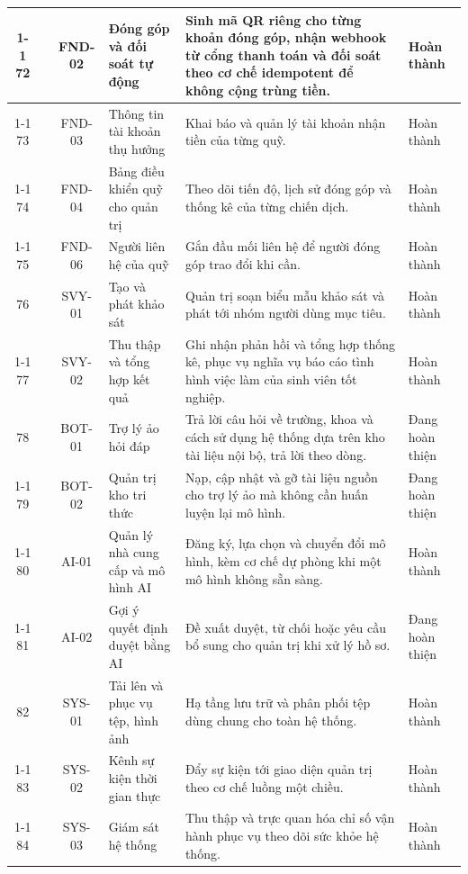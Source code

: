 \documentclass[12pt,a4paper,oneside]{report}
\begin{document}
\begin{longtable}{|c|>{\raggedright\arraybackslash}p{2.5cm}|c|>{\raggedright\arraybackslash}p{3.1cm}|>{\raggedright\arraybackslash}p{5.0cm}|>{\raggedright\arraybackslash}p{1.9cm}|}
\cline{1-1}\cline{3-6}
72 &  & FND-02 & Đóng góp và đối soát tự động & Sinh mã QR riêng cho từng khoản đóng góp, nhận webhook từ cổng thanh toán và đối soát theo cơ chế idempotent để không cộng trùng tiền. & Hoàn thành \\
\cline{1-1}\cline{3-6}
73 &  & FND-03 & Thông tin tài khoản thụ hưởng & Khai báo và quản lý tài khoản nhận tiền của từng quỹ. & Hoàn thành \\
\cline{1-1}\cline{3-6}
74 &  & FND-04 & Bảng điều khiển quỹ cho quản trị & Theo dõi tiến độ, lịch sử đóng góp và thống kê của từng chiến dịch. & Hoàn thành \\
\cline{1-1}\cline{3-6}
75 & \multirow{-5}{2.4cm}{\textbf{Gây quỹ}} & FND-06 & Người liên hệ của quỹ & Gắn đầu mối liên hệ để người đóng góp trao đổi khi cần. & Hoàn thành \\
\hline
76 &  & SVY-01 & Tạo và phát khảo sát & Quản trị soạn biểu mẫu khảo sát và phát tới nhóm người dùng mục tiêu. & Hoàn thành \\
\cline{1-1}\cline{3-6}
77 & \multirow{-2}{2.4cm}{\textbf{Khảo sát}} & SVY-02 & Thu thập và tổng hợp kết quả & Ghi nhận phản hồi và tổng hợp thống kê, phục vụ nghĩa vụ báo cáo tình hình việc làm của sinh viên tốt nghiệp. & Hoàn thành \\
\hline
78 &  & BOT-01 & Trợ lý ảo hỏi đáp & Trả lời câu hỏi về trường, khoa và cách sử dụng hệ thống dựa trên kho tài liệu nội bộ, trả lời theo dòng. & Đang hoàn thiện \\
\cline{1-1}\cline{3-6}
79 &  & BOT-02 & Quản trị kho tri thức & Nạp, cập nhật và gỡ tài liệu nguồn cho trợ lý ảo mà không cần huấn luyện lại mô hình. & Đang hoàn thiện \\
\cline{1-1}\cline{3-6}
80 &  & AI-01 & Quản lý nhà cung cấp và mô hình AI & Đăng ký, lựa chọn và chuyển đổi mô hình, kèm cơ chế dự phòng khi một mô hình không sẵn sàng. & Hoàn thành \\
\cline{1-1}\cline{3-6}
81 & \multirow{-4}{2.4cm}{\textbf{Trợ lý ảo và AI}} & AI-02 & Gợi ý quyết định duyệt bằng AI & Đề xuất duyệt, từ chối hoặc yêu cầu bổ sung cho quản trị khi xử lý hồ sơ. & Đang hoàn thiện \\
\hline
82 &  & SYS-01 & Tải lên và phục vụ tệp, hình ảnh & Hạ tầng lưu trữ và phân phối tệp dùng chung cho toàn hệ thống. & Hoàn thành \\
\cline{1-1}\cline{3-6}
83 &  & SYS-02 & Kênh sự kiện thời gian thực & Đẩy sự kiện tới giao diện quản trị theo cơ chế luồng một chiều. & Hoàn thành \\
\cline{1-1}\cline{3-6}
84 & \multirow{-3}{2.4cm}{\textbf{Nền tảng dùng chung}} & SYS-03 & Giám sát hệ thống & Thu thập và trực quan hóa chỉ số vận hành phục vụ theo dõi sức khỏe hệ thống. & Hoàn thành \\

\end{longtable}
\end{document}
